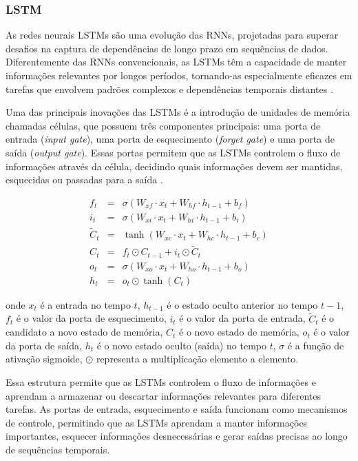  
 \subsubsection{LSTM}
 
 As redes neurais LSTMs são uma evolução das RNNs, projetadas para superar desafios na captura de dependências de longo prazo em sequências de dados. Diferentemente das RNNs convencionais, as LSTMs têm a capacidade de manter informações relevantes por longos períodos, tornando-as especialmente eficazes em tarefas que envolvem padrões complexos e dependências temporais distantes \cite{Zhang2021}.
 
 Uma das principais inovações das LSTMs é a introdução de unidades de memória chamadas células, que possuem três componentes principais: uma porta de entrada (\textit{input gate}), uma porta de esquecimento (\textit{forget gate}) e uma porta de saída (\textit{output gate}). Essas portas permitem que as LSTMs controlem o fluxo de informações através da célula, decidindo quais informações devem ser mantidas, esquecidas ou passadas para a saída \cite{Zhang2021}.
  
 \begin{eqnarray}
 	f_t &=& \sigma(W_{xf} \cdot x_t + W_{hf} \cdot h_{t-1} + b_f) \\
 	i_t &=& \sigma(W_{xi} \cdot x_t + W_{hi} \cdot h_{t-1} + b_i) \\
 	\tilde{C}_t &=& \tanh(W_{xc} \cdot x_t + W_{hc} \cdot h_{t-1} + b_c) \\
 	C_t &=& f_t \odot C_{t-1} + i_t \odot \tilde{C}_t \\
 	o_t &=& \sigma(W_{xo} \cdot x_t + W_{ho} \cdot h_{t-1} + b_o) \\
 	h_t &=& o_t \odot \tanh(C_t)
 \end{eqnarray}
 
\noindent onde $x_t$ é a entrada no tempo $t$, $h_{t-1}$ é o estado oculto anterior no tempo $t-1$, $f_t$ é o valor da porta de esquecimento, $i_t$ é o valor da porta de entrada, $\tilde{C}_t$ é o candidato a novo estado de memória, $C_t$ é o novo estado de memória, $o_t$ é o valor da porta de saída, $h_t$ é o novo estado oculto (saída) no tempo $t$, $\sigma$ é a função de ativação sigmoide, $\odot$ representa a multiplicação elemento a elemento.
 
 Essa estrutura permite que as LSTMs controlem o fluxo de informações e aprendam a armazenar ou descartar informações relevantes para diferentes tarefas. As portas de entrada, esquecimento e saída funcionam como mecanismos de controle, permitindo que as LSTMs aprendam a manter informações importantes, esquecer informações desnecessárias e gerar saídas precisas ao longo de sequências temporais.
 
